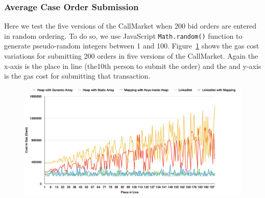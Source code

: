 


\subsubsection{Average Case Order Submission}

Here we test the five versions of the CallMarket when 200 bid orders are entered in random ordering. To do so, we use JavaScript \texttt{Math.random()} function to generate pseudo-random integers between 1 and 100. Figure~\ref{fig:average_case_submission} shows the gas cost variations for submitting 200 orders in five versions of the CallMarket. Again the x-axis is the place in line (\eg the10th person to submit the order) and the and y-axis is the gas cost for submitting that transaction. 


\begin{figure}[htb!p]
\centering
\includegraphics[width=1\textwidth]{fig/average_case_submission_3.png}
\caption{\footnotesize{}  \label{fig:average_case_submission}}
\end{figure}

















